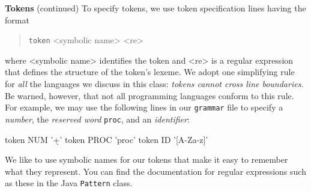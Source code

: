 \begin{minipage}[t]{\sw}
\slidenumber
\LARGE
{\bf Tokens} (continued)\exx
To specify tokens, we use token specification lines
having the format
\begin{quote}
\verb'token' <symbolic name> <re>
\end{quote}
where <symbolic name> identifies the token
and <re> is a regular expression that defines the structure
of the token's lexeme.\exx
We adopt one simplifying rule
for {\em all} the languages we discuss in this class:
{\em \mbox{tokens} cannot cross line boundaries}.
Be warned, however,
that not all programming languages conform to this rule.\exx
For example, we may use the following lines
in our \verb'grammar' file to specify 
a {\em number},
the {\em reserved word} \verb'proc',
and an {\em identifier}:
\begin{qv}
token NUM '\d+'
token PROC 'proc'
token ID '[A-Za-z]\w*'
\end{qv}
We like to use symbolic names for our tokens
that make it easy to remember what they represent.\exx
You can find the documentation for regular expressions
such as these in the Java \verb'Pattern' class.\exx
\end{minipage}
\clearpage
